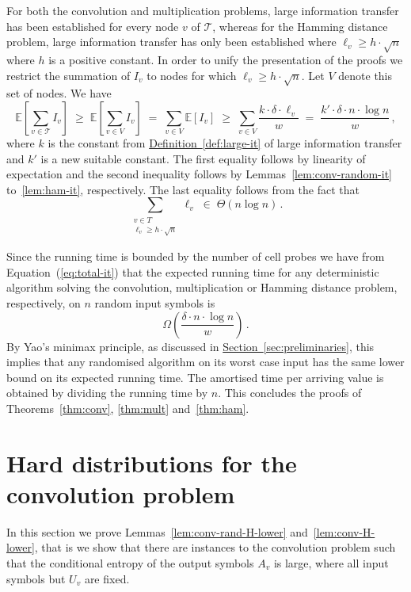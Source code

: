 \documentclass[11pt]{article}
\numberwithin{equation}{section}
\theoremstyle{definition}
\theoremstyle{plain}
\newcommand{\expref}[2]{\hyperref[#2]{#1~\ref{#2}}}
\newcommand{\calT}{\ensuremath{\mathcal{T}}}
\newcommand{\lit}{large information transfer\xspace}
\newcommand{\Xv}{\ensuremath{U_v}}
\newcommand{\Yv}{\ensuremath{A_v}}
\newcommand{\vit}{\ensuremath{I_v}}
\begin{document}
For both the convolution and multiplication problems, \lit has been established for every node $v$ of $\calT$, whereas for the Hamming distance problem, \lit has only been established where $\ell_v\geq h \cdot \sqrt{n}$ where $h$ is a positive constant.
In order to unify the presentation of the proofs we restrict the summation of $\vit$ to nodes for which $\ell_v\geq h \cdot \sqrt{n}$.
Let $V$ denote this set of nodes.
We have
\begin{equation}
\label{eq:total-it}
\mathbb{E}\left[\sum_{v\in\calT} \vit\right]
\;\geq\;
\mathbb{E}\left[\sum_{v\in V} \vit\right]
\;=\;
\sum_{v\in V} \mathbb{E}[\vit]
\;\geq\;
\sum_{v\in V} \frac{k\cdot\delta\cdot\ell_v}{w}
\;=\;
\frac{k'\cdot\delta\cdot n\cdot \log n}{w}\,,
\end{equation}
where $k$ is the constant from \expref{Definition}{def:large-it} of \lit and $k'$ is a new suitable constant.
The first equality follows by linearity of expectation and the second inequality follows by Lemmas~\ref{lem:conv-random-it} to~\ref{lem:ham-it}, respectively.
The last equality follows from the fact that
\[
\sum_{\substack{v\in T\\ \ell_v \geqslant h \cdot \sqrt{n}}} \ell_v \;\in\; \Theta(n\log n)\,.
\]

Since the running time is bounded by the number of cell probes we have from Equation~(\ref{eq:total-it}) that the expected running time for any deterministic algorithm solving the convolution, multiplication or Hamming distance problem, respectively, on $n$ random input symbols is
\[
\Omega\left(\frac{\delta\cdot n\cdot \log n}{w}\right)\,.
\]
By Yao's minimax principle, as discussed in \expref{Section}{sec:preliminaries}, this implies that any randomised algorithm on its worst case input has the same lower bound on its expected running time.
The amortised time per arriving value is obtained by dividing the running time by $n$.
This concludes the proofs of Theorems~\ref{thm:conv}, \ref{thm:mult} and~\ref{thm:ham}.


\section{Hard distributions for the convolution problem} \label{sec:conv}

In this section we prove Lemmas~\ref{lem:conv-rand-H-lower} and~\ref{lem:conv-H-lower}, that is we show that there are instances to the convolution problem such that the conditional entropy of the output symbols $\Yv$ is large, where all input symbols but $\Xv$ are fixed.
\end{document}
